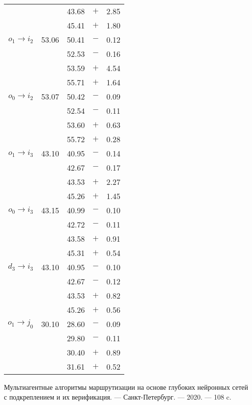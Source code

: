 \documentclass[a4paper]{article}
\newcommand{\sprule}{\rule{0pt}{1.3em}}
\begin{document}
\begin{longtable}{rrrcr}
              &       & 43.68 & $+$ & 2.85 \\
              &       & 45.41 & $+$ & 1.80 \\
    \sprule
    $o_1 \to i_2$ & 53.06 & 50.41 & $-$ & 0.12 \\
              &       & 52.53 & $-$ & 0.16 \\
              &       & 53.59 & $+$ & 4.54 \\
              &       & 55.71 & $+$ & 1.64 \\
    \sprule
    $o_0 \to i_2$ & 53.07 & 50.42 & $-$ & 0.09 \\
              &       & 52.54 & $-$ & 0.11 \\
              &       & 53.60 & $+$ & 0.63 \\
              &       & 55.72 & $+$ & 0.28 \\
    \newpage
    \sprule
    $o_1 \to i_3$ & 43.10 & 40.95 & $-$ & 0.14 \\
              &       & 42.67 & $-$ & 0.17 \\
              &       & 43.53 & $+$ & 2.27 \\
              &       & 45.26 & $+$ & 1.45 \\
    \sprule
    $o_0 \to i_3$ & 43.15 & 40.99 & $-$ & 0.10 \\
              &       & 42.72 & $-$ & 0.11 \\
              &       & 43.58 & $+$ & 0.91 \\
              &       & 45.31 & $+$ & 0.54 \\
    \sprule
    $d_3 \to i_3$ & 43.10 & 40.95 & $-$ & 0.10 \\
              &       & 42.67 & $-$ & 0.12 \\
              &       & 43.53 & $+$ & 0.82 \\
              &       & 45.26 & $+$ & 0.56 \\
    \sprule
    $o_1 \to j_0$ & 30.10 & 28.60 & $-$ & 0.09 \\
              &       & 29.80 & $-$ & 0.11 \\
              &       & 30.40 & $+$ & 0.89 \\
              &       & 31.61 & $+$ & 0.52 \\
    \bottomrule
\end{longtable}



\begin{thebibliography}{3}
        Мультиагентные алгоритмы маршрутизации на основе глубоких нейронных
        сетей с подкреплением и их верификация. --- Санкт-Петербург. --- 2020.
        --- 108 c.
\end{thebibliography}
\end{document}
